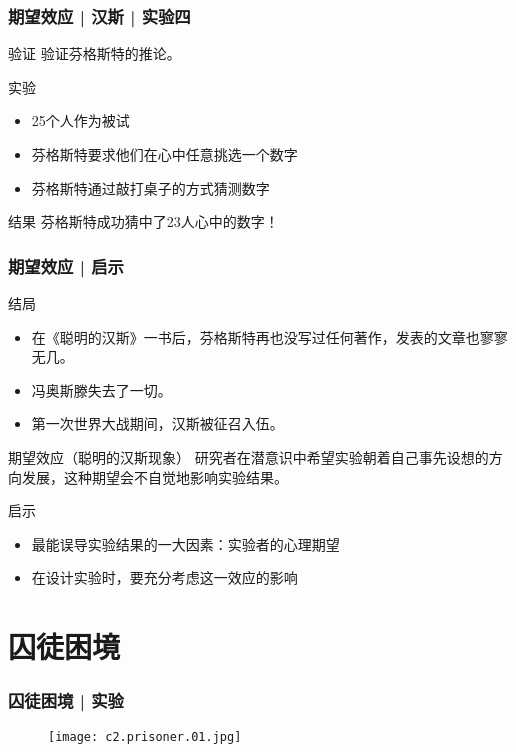 \begin{frame}
  \frametitle{期望效应 | 汉斯 | 实验四}
  \begin{block}{验证}
    验证芬格斯特的推论。
  \end{block}
  \pause
  \begin{block}{实验}
    \begin{itemize}
      \item 25个人作为被试
      \item 芬格斯特要求他们在心中任意挑选一个数字
      \item 芬格斯特通过敲打桌子的方式猜测数字
    \end{itemize}
  \end{block}
  \pause
  \begin{block}{结果}
    芬格斯特成功猜中了23人心中的数字！
  \end{block}
\end{frame}

\begin{frame}
  \frametitle{期望效应 | 启示}
  \begin{block}{结局}
    \begin{itemize}
      \item 在《聪明的汉斯》一书后，芬格斯特再也没写过任何著作，发表的文章也寥寥无几。
      \item 冯\textbullet 奥斯滕失去了一切。
      \item 第一次世界大战期间，汉斯被征召入伍。
    \end{itemize}
  \end{block}
  \pause
  \begin{block}{期望效应（聪明的汉斯现象）}
    研究者在潜意识中希望实验朝着自己事先设想的方向发展，这种期望会不自觉地影响实验结果。
  \end{block}
  \pause
  \begin{block}{启示}
    \begin{itemize}
      \item 最能误导实验结果的一大因素：实验者的心理期望
      \item 在设计实验时，要充分考虑这一效应的影响
    \end{itemize}
  \end{block}
\end{frame}

\section{囚徒困境}
\begin{frame}
  \frametitle{囚徒困境 | 实验}
  \begin{figure}
    \centering
    \texttt{[image: c2.prisoner.01.jpg]}
  \end{figure}
\end{frame}

